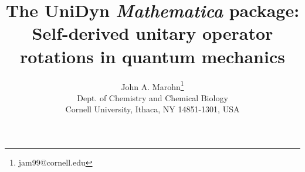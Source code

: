 \documentclass[12pt,letterpaper]{refart}
\begin{document}
\sloppy

\title{
  The UniDyn \emph{Mathematica} package:
  Self-derived unitary operator rotations in quantum mechanics}
\author{
	John A. Marohn\thanks{jam99@cornell.edu} \\ 
	{\footnotesize Dept. of Chemistry and Chemical Biology} \\ 
	{\footnotesize Cornell University, Ithaca, NY 14851-1301, USA}
}
\maketitle

\begin{abstract}
  
\end{abstract}

\pagestyle{fancy}  %

	\cfoot{\thepage}
	
\end{document}
